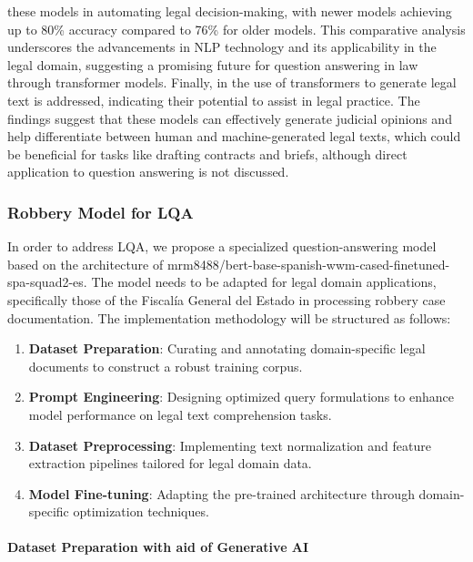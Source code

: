 \documentclass[onecolumn, journal, english, 12pt, a4paper]{IEEEtran} %
\theoremstyle{definition}
\begin{document}
these models in automating legal decision-making, with newer models
achieving up to 80\% accuracy compared to 76\% for older models. This
comparative analysis underscores the advancements in NLP technology
and its applicability in the legal domain, suggesting a promising
future for question answering in law through transformer
models. Finally, in \cite{Peric_Mijic_Stammbach_Ash_2020} the use of
transformers to generate legal text is addressed, indicating their
potential to assist in legal practice. The findings suggest that these
models can effectively generate judicial opinions and help
differentiate between human and machine-generated legal texts, which
could be beneficial for tasks like drafting contracts and briefs,
although direct application to question answering is not discussed.

\subsubsection{Robbery Model for LQA}
\label{sec:robbery-model-lqa}

In order to address LQA, we propose a specialized question-answering
model based on the architecture of
mrm8488/bert-base-spanish-wwm-cased-finetuned-spa-squad2-es. The model
needs to be adapted for legal domain applications, specifically those
of the Fiscalía General del Estado in processing robbery case
documentation. The implementation methodology will be structured as
follows:

\begin{enumerate}
    \item \textbf{Dataset Preparation}: Curating and annotating domain-specific legal documents to construct a robust training corpus.
    \item \textbf{Prompt Engineering}: Designing optimized query formulations to enhance model performance on legal text comprehension tasks.
    \item \textbf{Dataset Preprocessing}: Implementing text normalization and feature extraction pipelines tailored for legal domain data.
    \item \textbf{Model Fine-tuning}: Adapting the pre-trained architecture through domain-specific optimization techniques.
    \end{enumerate}

\paragraph{Dataset Preparation with aid of Generative AI}
\end{document}
